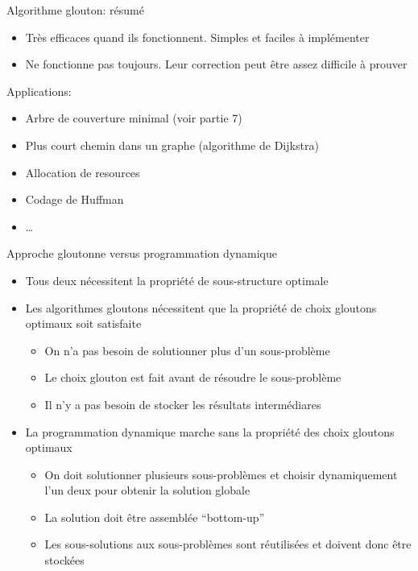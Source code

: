\begin{frame}{Algorithme glouton: résumé}

\begin{itemize}
\item Très efficaces quand ils fonctionnent. Simples et faciles à
  implémenter
\item Ne fonctionne pas toujours. Leur correction peut être assez
  difficile à prouver
\end{itemize}

\bigskip

Applications:
\begin{itemize}
\item Arbre de couverture minimal (voir partie 7)
\item Plus court chemin dans un graphe (algorithme de Dijkstra)
\item Allocation de resources
\item Codage de Huffman
\item \ldots
\end{itemize}

\end{frame}

\begin{frame}{Approche gloutonne versus programmation dynamique}

\begin{itemize}
\item Tous deux nécessitent la propriété de sous-structure optimale

\bigskip

\item Les algorithmes gloutons nécessitent que la propriété de choix gloutons optimaux soit satisfaite
\begin{itemize}
\item On n'a pas besoin de solutionner plus d'un sous-problème
\item Le choix glouton est fait \alert{avant} de résoudre le sous-problème
\item Il n'y a pas besoin de stocker les résultats intermédiares
\end{itemize}

\bigskip

\item La programmation dynamique marche sans la propriété des choix gloutons optimaux
\begin{itemize}
\item On doit solutionner plusieurs sous-problèmes et choisir dynamiquement l'un deux pour obtenir la solution globale
\item La solution doit être assemblée ``bottom-up''
\item Les sous-solutions aux sous-problèmes sont réutilisées et doivent donc être stockées
\end{itemize}
\end{itemize}

\end{frame}


